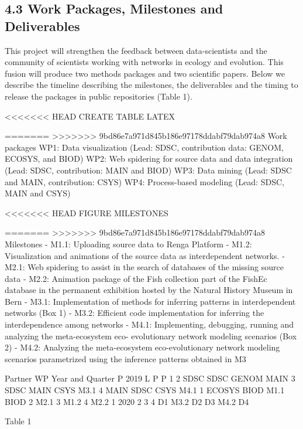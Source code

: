 \documentclass[12pt]{article}
\begin{document}
\begin{center}
\section*{4.3 Work Packages, Milestones and Deliverables}

This project will strengthen the feedback between data-scientists and the community of
scientists working with networks in ecology and evolution. This fusion will produce two
methods packages and two scientific papers. Below we describe the timeline describing the
milestones, the deliverables and the timing to release the packages in public repositories (Table
1).

<<<<<<< HEAD
CREATE TABLE LATEX

=======
>>>>>>> 9bd86e7a971d845b186e97178ddabf79dab974a8
Work packages
WP1: Data visualization (Lead: SDSC, contribution data: GENOM, ECOSYS, and BIOD)
WP2: Web spidering for source data and data integration (Lead: SDSC, contribution: MAIN
and BIOD)
WP3: Data mining (Lead: SDSC and MAIN, contribution: CSYS)
WP4: Process-based modeling (Lead: SDSC, MAIN and CSYS)

<<<<<<< HEAD
FIGURE MILESTONES

=======
>>>>>>> 9bd86e7a971d845b186e97178ddabf79dab974a8
Milestones
- M1.1: Uploading source data to Renga Platform
- M1.2: Visualization and animations of the source data as interdependent networks.
- M2.1: Web spidering to assist in the search of databases of the missing source data
- M2.2: Animation package of the Fish collection part of the FishEc database in the
permanent exhibition hosted by the Natural History Museum in Bern
- M3.1: Implementation of methods for inferring patterns in interdependent networks
(Box 1)
- M3.2: Efficient code implementation for inferring the interdependence among
networks
- M4.1: Implementing, debugging, running and analyzing the meta-ecosystem eco-
evolutionary network modeling scenarios (Box 2)
- M4.2: Analyzing the meta-ecosystem eco-evolutionary network modeling scenarios
parametrized using the inference patterns obtained in M3

Partner
WP
Year and Quarter
P
2019
L P
P
1
2 SDSC
SDSC GENOM
MAIN 3 SDSC MAIN CSYS M3.1
4 MAIN SDSC CSYS M4.1
1
ECOSYS BIOD M1.1
BIOD
2
M2.1
3
M1.2
4
M2.2
1
2020
2
3
4
D1
M3.2
D2 D3
M4.2 D4

Table 1



\end{center}
\end{document}

